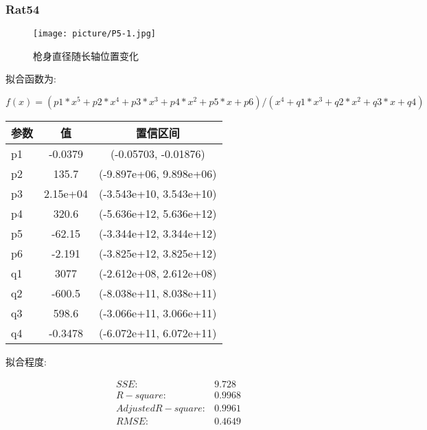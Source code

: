 \documentclass[UTF8]{ctexart}
\begin{document}
			\subsubsection{Rat54}
					\begin{figure}[h]
							\texttt{[image: picture/P5-1.jpg]}
							\caption{枪身直径随长轴位置变化}
					\end{figure}
					\begin{flushleft}
						拟合函数为:
					\end{flushleft}
					\begin{center}
						\[ f(x) =(p1*x^5 + p2*x^4 + p3*x^3 + p4*x^2 + p5*x + p6)/
						(x^4 + q1*x^3 + q2*x^2 + q3*x + q4)
						\]
					\end{center}
					\begin{center}
					\begin{tabular}{|l|c|c|}
						\hline
						参数&值&置信区间\\
						\hline
						p1 & -0.0379 &  (-0.05703, -0.01876)\\
						\hline
						p2 & 135.7&  (-9.897e+06, 9.898e+06)\\
						\hline
						p3 & 2.15e+04&  (-3.543e+10, 3.543e+10)\\
						\hline
						p4 & 320.6&  (-5.636e+12, 5.636e+12)\\
						\hline
						p5 & -62.15&  (-3.344e+12, 3.344e+12)\\
						\hline
						p6 & -2.191&  (-3.825e+12, 3.825e+12)\\
						\hline
						q1 & 3077&  (-2.612e+08, 2.612e+08)\\
						\hline
						q2 & -600.5&  (-8.038e+11, 8.038e+11)\\
						\hline
						q3 & 598.6&  (-3.066e+11, 3.066e+11)\\
						\hline
						q4 & -0.3478&  (-6.072e+11, 6.072e+11)\\
						\hline
					\end{tabular}
				\end{center}
			\begin{flushleft}
				拟合程度:
			\end{flushleft}
				\begin{center}
					$$
					\begin{matrix}
						SSE:&9.728\\
						R-square:&0.9968\\
						Adjusted R-square:&0.9961\\
						RMSE:&0.4649\\
					\end{matrix}
					$$
				\end{center}
\end{document}
